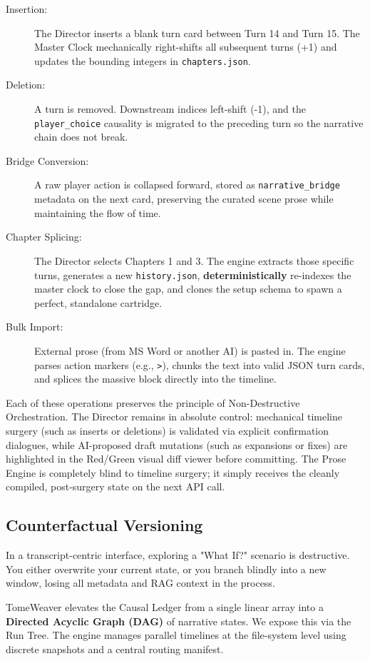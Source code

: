 \documentclass[12pt, a4paper]{article}
\begin{document}
\begin{description}
    \item[Insertion:] The Director inserts a blank turn card between Turn 14 and Turn 15. The Master Clock mechanically right-shifts all subsequent turns (+1) and updates the bounding integers in \texttt{chapters.json}.
    \item[Deletion:] A turn is removed. Downstream indices left-shift (-1), and the \texttt{player\_choice} causality is migrated to the preceding turn so the narrative chain does not break.
    \item[Bridge Conversion:] A raw player action is collapsed forward, stored as \texttt{narrative\_bridge} metadata on the next card, preserving the curated scene prose while maintaining the flow of time.
    \item[Chapter Splicing:] The Director selects Chapters 1 and 3. The engine extracts those specific turns, generates a new \texttt{history.json}, \textbf{deterministically} re-indexes the master clock to close the gap, and clones the setup schema to spawn a perfect, standalone cartridge.
    \item[Bulk Import:] External prose (from MS Word or another AI) is pasted in. The engine parses action markers (e.g., \texttt{>}), chunks the text into valid JSON turn cards, and splices the massive block directly into the timeline.
\end{description}

Each of these operations preserves the principle of Non-Destructive Orchestration. The Director remains in absolute control: mechanical timeline surgery (such as inserts or deletions) is validated via explicit confirmation dialogues, while AI-proposed draft mutations (such as expansions or fixes) are highlighted in the Red/Green visual diff viewer before committing. The Prose Engine is completely blind to timeline surgery; it simply receives the cleanly compiled, post-surgery state on the next API call.

\subsection{Counterfactual Versioning}

In a transcript-centric interface, exploring a "What If?" scenario is destructive. You either overwrite your current state, or you branch blindly into a new window, losing all metadata and RAG context in the process. 

TomeWeaver elevates the Causal Ledger from a single linear array into a \textbf{Directed Acyclic Graph (DAG)} of narrative states. We expose this via the Run Tree. The engine manages parallel timelines at the file-system level using discrete snapshots and a central routing manifest. 
\end{document}
